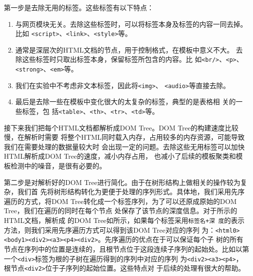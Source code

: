 第一步是去除无用的标签。这些标签有以下特点：
\begin{enumerate}
 \item\label{item:1} 与网页模块无关。去除这些标签时，可以将标签本身及标签的内容一同去掉。比如
  \texttt{<script>}、\texttt{<link>}、\texttt{<style>}等。
\item\label{item:2} 通常是深层次的HTML文档的节点，用于控制格式，在模板中意义不大。
  去除这些标签时只取出标签本身，保留标签所包含的内容。比
  如\texttt{<br/>}、\texttt{<p>}、\texttt{<strong>}、\texttt{<em>}等。
\item\label{item:3} 我们在实验中不考虑非文本标签，因此将\texttt{<img>}、
  \texttt{<audio>}等直接去除。
\item\label{item:4} 最后是去除一些在模板中变化很大的太复杂的标签，典型的是表格相
  关的一些标签，包
  括\texttt{<table>}、\texttt{<th>}、\texttt{<tr>}、\texttt{<td>}等。
\end{enumerate}

接下来我们把每个HTML文档都解析成DOM Tree。DOM Tree的构建速度比较慢，在解析时需要
将整个HTML同时载入内存，占用较多的内存资源，可能导致我们在需要处理的数据量较大时
会出现一定的问题。去除这些无用标签可以加快HTML解析成DOM Tree的速度，减小内存占用，
也减小了后续的模板聚类和模板检测中的噪音，是很有必要的。

第二步是对解析好的DOM Tree进行简化。由于在树形结构上做相关的操作较为复杂，我们首
先将树形结构转化为更便于处理的序列形式。具体地，我们采用先序遍历的方式，将DOM
Tree转化成一个标签序列，为了可以还原成原始的DOM Tree，我们在遍历的同时在每个节点
处保存了该节点的深度信息。对于所示的HTML文档，解析成
的DOM Tree如所示，如果每个标签采用\texttt{标签名+深
  度}的表示方法，则我们采用先序遍历方式可以得到该DOM Tree对应的序列
为：\texttt{<html0><body1><div2><a3><p4><div2>}。先序遍历的优点在于可以保证每个子
树的所有节点在序列中的位置是连续的，且根节点位于这段连续子序列的起始处。比如以第
一个\texttt{<div>}标签为根的子树在遍历得到的序列中对应的序列
为\texttt{<div2><a3><p4>}，根节点\texttt{<div2>}位于子序列的起始位置。这些特点对
于后续的处理有很大的帮助。


